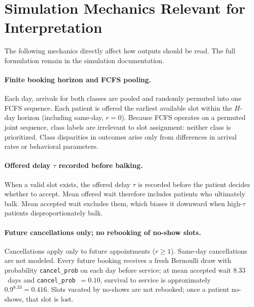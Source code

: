 \documentclass[11pt]{article}
\begin{document}
\begin{abstract}
Mean offered wait is more informative than mean accepted wait as a congestion
diagnostic because offered delay is recorded before the balking decision.
However, it is still conditional on receiving an offer, so it should be read
together with no-offer share. In the baseline, no-offer is zero; it begins to
grow once demand is high enough to saturate the booking horizon.
\end{abstract}

\newpage
\tableofcontents
\newpage

\section{Simulation Mechanics Relevant for Interpretation}
\label{sec:mechanics}

The following mechanics directly affect how outputs should be read. The full
formulation remain in the simulation documentation.

\paragraph{Finite booking horizon and FCFS pooling.}
Each day, arrivals for both classes are pooled and randomly permuted into one
FCFS sequence. Each patient is offered the earliest available slot within the
$H$-day horizon (including same-day, $r=0$). Because FCFS operates on a
permuted joint sequence, class labels are irrelevant to slot assignment:
neither class is prioritized. Class disparities in outcomes arise only from
differences in arrival rates or behavioral parameters.

\paragraph{Offered delay $\tau$ recorded before balking.}
When a valid slot exists, the offered delay $\tau$ is recorded before the
patient decides whether to accept. Mean offered wait therefore includes
patients who ultimately balk. Mean accepted wait excludes them, which biases
it downward when high-$\tau$ patients disproportionately balk.

\paragraph{Future cancellations only; no rebooking of no-show slots.}
Cancellations apply only to future appointments ($r \geq 1$). Same-day
cancellations are not modeled. Every future booking receives a fresh
Bernoulli draw with probability \texttt{cancel\_prob} on each day before
service; at mean accepted wait $8.33$~days and \texttt{cancel\_prob}~$=0.10$,
survival to service is approximately $0.9^{8.33}=0.416$. Slots vacated by
no-shows are not rebooked; once a patient no-shows, that slot is lost.
\end{document}
